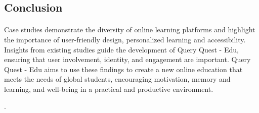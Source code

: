 \subsection{Conclusion}
\paragraph{}Case studies demonstrate the diversity of online learning platforms and highlight the importance of user-friendly design, personalized learning and accessibility. Insights from existing studies guide the development of Query Quest - Edu, ensuring that user involvement, identity, and engagement are important. Query Quest - Edu aims to use these findings to create a new online education that meets the needs of global students, encouraging motivation, memory and learning, and well-being in a practical and productive environment.

.

\vspace{9.5cm}





